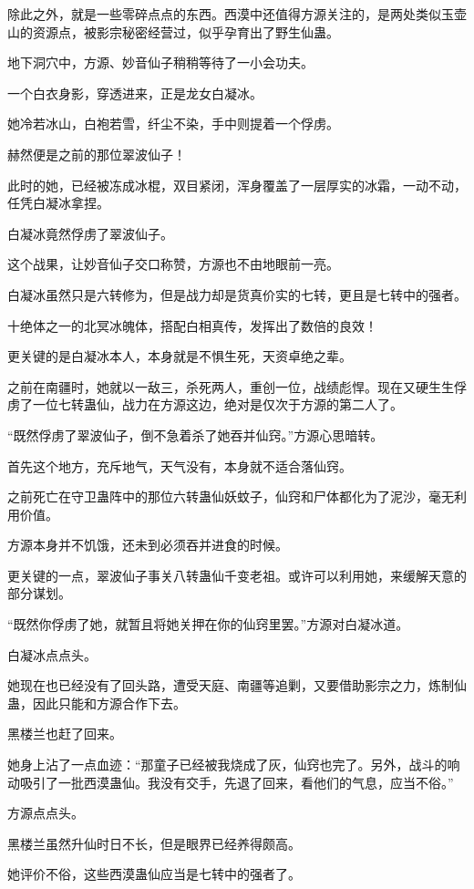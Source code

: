 \begin{this_body}
除此之外，就是一些零碎点点的东西。西漠中还值得方源关注的，是两处类似玉壶山的资源点，被影宗秘密经营过，似乎孕育出了野生仙蛊。

地下洞穴中，方源、妙音仙子稍稍等待了一小会功夫。

一个白衣身影，穿透进来，正是龙女白凝冰。

她冷若冰山，白袍若雪，纤尘不染，手中则提着一个俘虏。

赫然便是之前的那位翠波仙子！

此时的她，已经被冻成冰棍，双目紧闭，浑身覆盖了一层厚实的冰霜，一动不动，任凭白凝冰拿捏。

白凝冰竟然俘虏了翠波仙子。

这个战果，让妙音仙子交口称赞，方源也不由地眼前一亮。

白凝冰虽然只是六转修为，但是战力却是货真价实的七转，更且是七转中的强者。

十绝体之一的北冥冰魄体，搭配白相真传，发挥出了数倍的良效！

更关键的是白凝冰本人，本身就是不惧生死，天资卓绝之辈。

之前在南疆时，她就以一敌三，杀死两人，重创一位，战绩彪悍。现在又硬生生俘虏了一位七转蛊仙，战力在方源这边，绝对是仅次于方源的第二人了。

“既然俘虏了翠波仙子，倒不急着杀了她吞并仙窍。”方源心思暗转。

首先这个地方，充斥地气，天气没有，本身就不适合落仙窍。

之前死亡在守卫蛊阵中的那位六转蛊仙妖蚊子，仙窍和尸体都化为了泥沙，毫无利用价值。

方源本身并不饥饿，还未到必须吞并进食的时候。

更关键的一点，翠波仙子事关八转蛊仙千变老祖。或许可以利用她，来缓解天意的部分谋划。

“既然你俘虏了她，就暂且将她关押在你的仙窍里罢。”方源对白凝冰道。

白凝冰点点头。

她现在也已经没有了回头路，遭受天庭、南疆等追剿，又要借助影宗之力，炼制仙蛊，因此只能和方源合作下去。

黑楼兰也赶了回来。

她身上沾了一点血迹：“那童子已经被我烧成了灰，仙窍也完了。另外，战斗的响动吸引了一批西漠蛊仙。我没有交手，先退了回来，看他们的气息，应当不俗。”

方源点点头。

黑楼兰虽然升仙时日不长，但是眼界已经养得颇高。

她评价不俗，这些西漠蛊仙应当是七转中的强者了。


\end{this_body}
